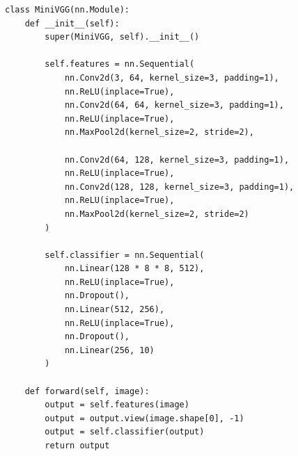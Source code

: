 \documentclass[a4paper, 14pt]{extarticle}
\begin{document}
\begin{lstlisting}[language={},caption={MiniVGG},label={lst:code3}, breaklines=true]
class MiniVGG(nn.Module):
    def __init__(self):
        super(MiniVGG, self).__init__()

        self.features = nn.Sequential(
            nn.Conv2d(3, 64, kernel_size=3, padding=1),
            nn.ReLU(inplace=True),
            nn.Conv2d(64, 64, kernel_size=3, padding=1),
            nn.ReLU(inplace=True),
            nn.MaxPool2d(kernel_size=2, stride=2),

            nn.Conv2d(64, 128, kernel_size=3, padding=1),
            nn.ReLU(inplace=True),
            nn.Conv2d(128, 128, kernel_size=3, padding=1),
            nn.ReLU(inplace=True),
            nn.MaxPool2d(kernel_size=2, stride=2)
        )

        self.classifier = nn.Sequential(
            nn.Linear(128 * 8 * 8, 512),
            nn.ReLU(inplace=True),
            nn.Dropout(),
            nn.Linear(512, 256),
            nn.ReLU(inplace=True),
            nn.Dropout(),
            nn.Linear(256, 10)
        )

    def forward(self, image):
        output = self.features(image)
        output = output.view(image.shape[0], -1)
        output = self.classifier(output)
        return output
\end{lstlisting}
\end{document}
